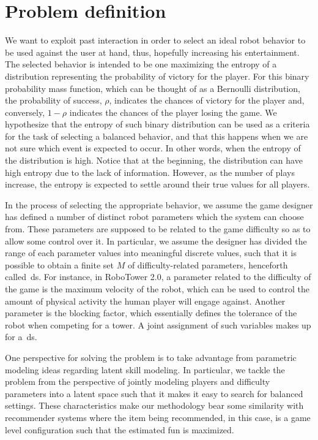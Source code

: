 \section{Problem definition}
We want to exploit past interaction in order to select an ideal robot behavior to be used against the user at hand, thus, hopefully increasing his entertainment. The selected behavior is intended to be one maximizing the entropy of a distribution representing the probability of victory for the player. For this binary probability mass function, which can be thought of as a Bernoulli distribution, the probability of success, $\rho$, indicates the chances of victory for the player and, conversely, $1-\rho$ indicates the chances of the player losing the game. We hypothesize that the entropy of such binary distribution can be used as a criteria for the task of selecting a balanced behavior, and that this happens when we are not sure which event is expected to occur. In other words, when the entropy of the distribution is high. %
Notice that at the beginning, the distribution can have high entropy due to the lack of information. However, as the number of plays increase, the entropy is expected to settle around their true values for all players.

In the process of selecting the appropriate behavior, we assume the game designer has defined a number of distinct robot parameters which the system can choose from. These parameters are supposed to be related to the game difficulty so as to allow some control over it. In particular, we assume the designer has divided the range of each parameter values into meaningful discrete values, such that it is possible to obtain a finite set $M$ of difficulty-related parameters, henceforth called~\gls{ds}. For instance, in RoboTower 2.0, a parameter related to the difficulty of the game is the maximum velocity of the robot, which can be used to control the amount of physical activity the human player will engage against. Another parameter is the blocking factor, which essentially defines the tolerance of the robot when competing for a tower. A joint assignment of such variables makes up for a~\gls{ds}. 

One perspective for solving the problem is to take advantage from parametric modeling ideas regarding latent skill modeling. In particular, we tackle the problem from the perspective of jointly modeling players and difficulty parameters into a latent space such that it makes it easy to search for balanced settings. These characteristics make our methodology bear some similarity with recommender systems where the item being recommended, in this case, is a game level configuration such that the estimated fun is maximized. 

